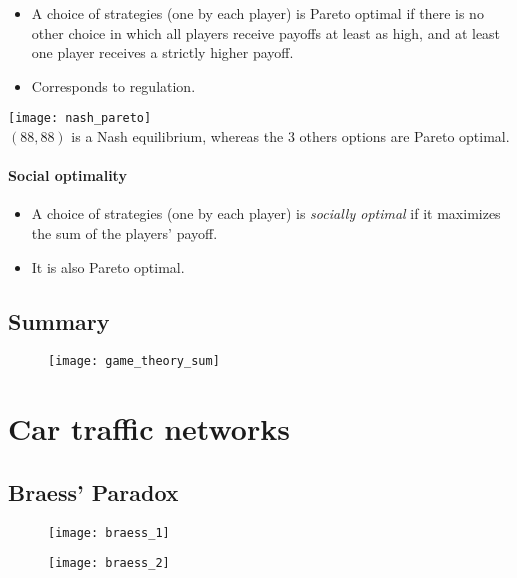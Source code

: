 \begin{itemize}
\item A choice of strategies (one by each player) is Pareto optimal if there is no other choice in which all players receive payoffs at least as high, and at least one player receives a strictly higher payoff.
\item Corresponds to regulation.
\end{itemize}

\begin{table}[H]
    \centering
    \texttt{[image: nash\_pareto]}\\
    $(88, 88)$ is a Nash equilibrium, whereas the 3 others options are Pareto optimal.
\end{table}

\subsubsection{Social optimality}

\begin{itemize}
\item A choice of strategies (one by each player) is \textit{socially optimal} if it maximizes the sum of the players' payoff.
\item It is also Pareto optimal.
\end{itemize}

\section{Summary}

\begin{figure}[H]
    \centering
    \texttt{[image: game\_theory\_sum]}
\end{figure}

\chapter{Car traffic networks}

\section{Braess' Paradox}

\begin{figure}[H]
    \centering
    \texttt{[image: braess\_1]}
\end{figure}

\begin{figure}[H]
    \centering
    \texttt{[image: braess\_2]}
\end{figure}

